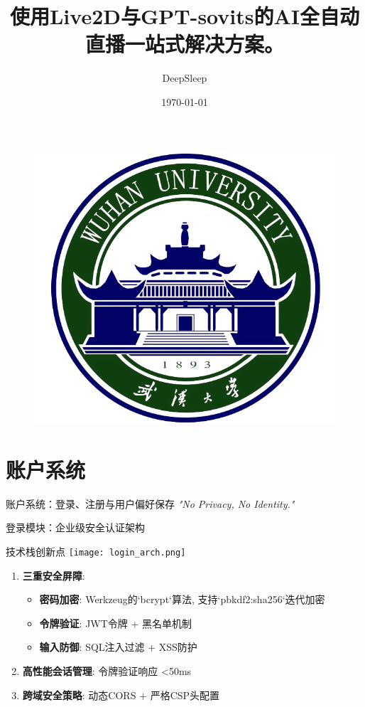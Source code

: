\documentclass{beamer}
\author{DeepSleep}
\title{使用Live2D与GPT-sovits的AI全自动直播一站式解决方案。}
\institute{武汉大学计算机科学院}
\date{\today}
\begin{document}
\begin{frame}
    \titlepage
    \begin{figure}[htpb]
        \begin{center}
            \includegraphics[width=0.2\linewidth]{pic/whulogo.png}
        \end{center}
    \end{figure}
\end{frame}

\begin{frame}
    \tableofcontents[sectionstyle=show,subsectionstyle=show/shaded/hide,subsubsectionstyle=show/shaded/hide]
\end{frame}






\section{账户系统}

\begin{frame}{账户系统：登录、注册与用户偏好保存}
    \centering
    \textit{"No Privacy, No Identity."}
\end{frame}

\begin{frame}{登录模块：企业级安全认证架构}
    \begin{block}{技术栈创新点}
        \centering
        \texttt{[image: login\_arch.png]}
    \end{block}
    \begin{enumerate}
        \item \textbf{三重安全屏障}:
        \begin{itemize}
            \item \textbf{密码加密}: Werkzeug的`bcrypt`算法, 支持`pbkdf2:sha256`迭代加密
            \item \textbf{令牌验证}: JWT令牌 + 黑名单机制
            \item \textbf{输入防御}: SQL注入过滤 + XSS防护
        \end{itemize}
        \item \textbf{高性能会话管理}: 令牌验证响应 <50ms
        \item \textbf{跨域安全策略}: 动态CORS + 严格CSP头配置
    \end{enumerate}
\end{frame}
\end{document}
